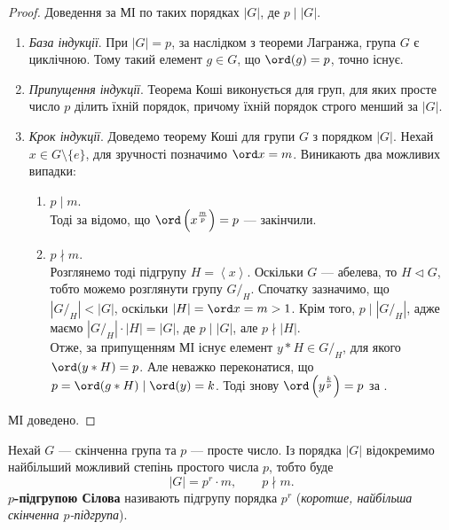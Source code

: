 \documentclass{math_library}
\begin{document}
\begin{proof}
Доведення за МІ по таких порядках $|G|$, де $p \mid |G|$.
\begin{enumerate}[wide=0pt,nosep,label={\Roman*.}]
\item \textit{База індукції}. При $|G| = p$, за наслідком з теореми Лагранжа, група $G$ є циклічною. Тому такий елемент $g \in G$, що $\ord(g) = p$, точно існує.

\item \textit{Припущення індукції}. Теорема Коші виконується для груп, для яких просте число $p$ ділить їхній порядок, причому їхній порядок строго менший за $|G|$.

\item \textit{Крок індукції}. Доведемо теорему Коші для групи $G$ з порядком $|G|$. Нехай $x \in G \setminus \{e\}$, для зручності позначимо $\ord x = m$. Виникають два можливих випадки:
\begin{enumerate}[wide=0pt,label={\roman*)}]
\item $p \mid m$.\\
Тоді за  відомо, що $\ord \left(x^{\frac{m}{p}} \right) = p$ --- закінчили.

\item $p \nmid m$.\\
Розглянемо тоді підгрупу $H = \left<x\right>$. Оскільки $G$ --- абелева, то $H \triangleleft G$, тобто можемо розглянути групу $G/_H$. Спочатку зазначимо, що $|G/_H| < |G|$, оскільки $|H| = \ord x = m > 1$. Крім того, $p \mid |G/_H|$, адже маємо $|G/_H| \cdot |H| = |G|$, де $p \mid |G|$, але $p \nmid |H|$.\\
Отже, за припущенням МІ існує елемент $y*H \in G/_H$, для якого $\ord(y*H) = p$. Але неважко переконатися, що $p = \ord(g*H) \mid \ord(y) = k$. Тоді знову $\ord\left(y^{\frac{k}{p}}\right) = p$ за .
\end{enumerate}
\end{enumerate}
МІ доведено.
\end{proof}

\begin{definition}
Нехай $G$ --- скінченна група та $p$ --- просте число. Із порядка $|G|$ відокремимо найбільший можливий степінь простого числа $p$, тобто буде
\[
|G| = p^r \cdot m, \qquad p \nmid m.
\]
\textbf{$p$-підгрупою Сілова} називають підгрупу порядка $p^r$ (\textit{коротше, найбільша скінченна $p$-підгрупа}).
\end{definition}
\end{document}
